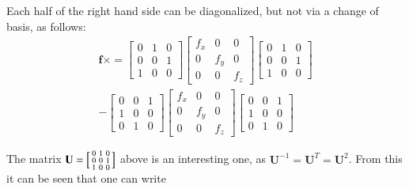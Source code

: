 \documentclass{article}      %
\newcommand{\Bf}[0]{\mathbf{f}}
\newcommand{\BU}[0]{\mathbf{U}}
\newcommand{\cross}[0]{\times}
\begin{document}
Each half of the right hand side can be diagonalized, but not via a change of basis, as follows:
\begin{multline*}
\Bf \cross =
\begin{bmatrix}
0 & 1 & 0 \\
0 & 0 & 1 \\
1 & 0 & 0
\end{bmatrix}
\begin{bmatrix}
f_x & 0 & 0 \\
0 & f_y & 0 \\
0 & 0 & f_z
\end{bmatrix}
\begin{bmatrix}
0 & 1 & 0 \\
0 & 0 & 1 \\
1 & 0 & 0
\end{bmatrix} \\
-
\begin{bmatrix}
0 & 0 & 1 \\
1 & 0 & 0 \\
0 & 1 & 0
\end{bmatrix}
\begin{bmatrix}
f_x & 0 & 0 \\
0 & f_y & 0 \\
0 & 0 & f_z
\end{bmatrix}
\begin{bmatrix}
0 & 0 & 1 \\
1 & 0 & 0 \\
0 & 1 & 0
\end{bmatrix}
\end{multline*}

The matrix
$ \BU =
\Bigl[
\begin{smallmatrix}
0 & 1 & 0 \\
0 & 0 & 1 \\
1 & 0 & 0
\end{smallmatrix}
\Bigr]
$ above is an interesting one, as $\BU^{-1} = \BU^T = \BU^2$.
From this it can be seen that one can write
\end{document}
